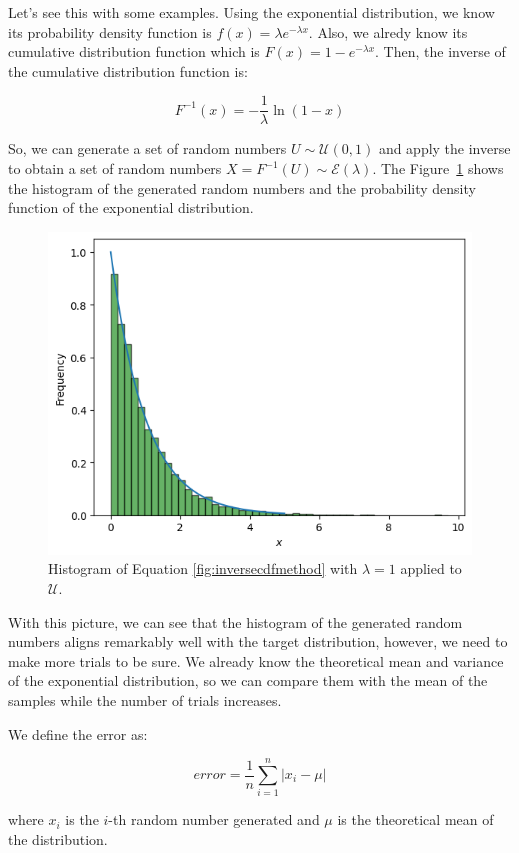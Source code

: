 \documentclass{article}
\begin{document}
Let's see this with some examples. Using the exponential distribution, we know its probability density function is \(f(x) = \lambda e^{-\lambda x}\).  Also, we alredy know its cumulative distribution function which is \(F(x) = 1 - e^{-\lambda x}\). Then, the inverse of the cumulative distribution function is:

\begin{equation}\label{eq:inversecdf} F^{-1}(x)  = -\frac{1}{\lambda} \ln(1-x) \end{equation}

So, we can generate a set of random numbers \(U \sim \mathcal{U}(0,1)\) and apply the inverse to obtain a set of random numbers \(X = F^{-1}(U) \sim \mathcal{E}(\lambda)\). The Figure~\ref{fig:inversecdfmethod} shows the histogram of the generated random numbers and the probability density function of the exponential distribution.

\begin{figure}[H]
	\centering
	\includegraphics[width=0.5\linewidth]{./Figures/InverseCDF/histogram.png}
	\caption{Histogram of Equation \eqref{fig:inversecdfmethod} with \(\lambda = 1\) applied to \(\mathcal{U}\).}
	\label{fig:inversecdfmethod}
\end{figure}

With this picture, we can see that the histogram of the generated random numbers aligns remarkably well with the target distribution, however, we need to make more trials to be sure. We already know the theoretical mean and variance of the exponential distribution, so we can compare them with the mean of the samples while the number of trials increases.

We define the error as:

\begin{equation*} error = \frac{1}{n}\sum_{i=1}^{n} | x_i - \mu | \end{equation*}

where \(x_i\) is the \(i\)-th random number generated and \(\mu\) is the theoretical mean of the distribution.
\end{document}
